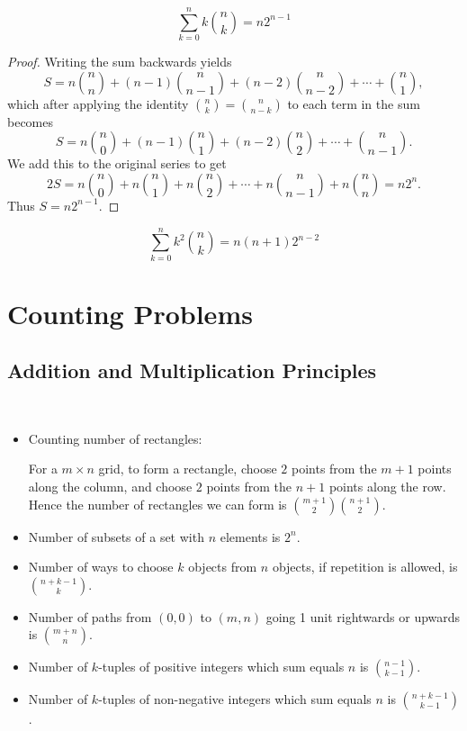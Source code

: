\begin{proposition}
\begin{equation}
\sum_{k=0}^{n} k \binom{n}{k} = n 2^{n-1}
\end{equation}
\end{proposition}

\begin{proof}
Writing the sum backwards yields
\[S=n\binom{n}{n}+(n-1)\binom{n}{n-1}+(n-2)\binom{n}{n-2}+\cdots+\binom{n}{1},\]
which after applying the identity $\binom{n}{k}=\binom{n}{n-k}$ to each term in the sum becomes
\[S=n\binom{n}{0}+(n-1)\binom{n}{1}+(n-2)\binom{n}{2}+\cdots+\binom{n}{n-1}.\]
We add this to the original series to get
\[2S=n\binom{n}{0}+n\binom{n}{1}+n\binom{n}{2}+\cdots+n\binom{n}{n-1}+n\binom{n}{n}=n2^n.\]
Thus $S=n2^{n-1}$.
\end{proof}

\begin{equation}
\sum_{k=0}^{n} k^2 \binom{n}{k} = n(n+1) 2^{n-2}
\end{equation}
\pagebreak

\section{Counting Problems}
\subsection{Addition and Multiplication Principles}

\begin{example} \
\begin{itemize}
\item Counting number of rectangles:

For a $m \times n$ grid, to form a rectangle, choose $2$ points from the $m+1$ points along the column, and choose $2$ points from the $n+1$ points along the row. Hence the number of rectangles we can form is ${m+1 \choose 2}{n+1 \choose 2}$.

\item Number of subsets of a set with $n$ elements is $2^n$.

\item Number of ways to choose $k$ objects from $n$ objects, if repetition is allowed, is $\binom{n+k-1}{k}$.

\item Number of paths from $(0,0)$ to $(m,n)$ going 1 unit rightwards or upwards is $\binom{m+n}{n}$.

\item Number of $k$-tuples of positive integers which sum equals $n$ is $\binom{n-1}{k-1}$.

\item Number of $k$-tuples of non-negative integers which sum equals $n$ is $\binom{n+k-1}{k-1}$.
\end{itemize}
\end{example}

